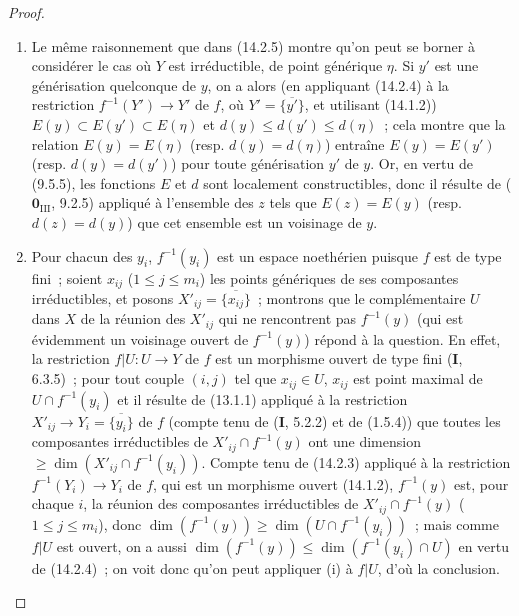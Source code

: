 \begin{proof}
\begin{enumerate}[label=(\roman*)]
  \item Le même raisonnement que dans (14.2.5) montre qu'on peut se borner à
  considérer le cas où $Y$ est irréductible, de point générique $\eta$. Si $y'$
  est une générisation quelconque de $y$, on a alors (en appliquant (14.2.4) à la
  restriction $f^{-1}(Y')\to Y'$ de $f$, où $Y'=\overline{\{y'\}}$, et utilisant
  (14.1.2)) $E(y)\subset E(y')\subset E(\eta)$ et
  $d(y)\leq d(y')\leq d(\eta)$~; cela montre que la relation $E(y)=E(\eta)$
  (resp. $d(y)=d(\eta)$) entraîne $E(y)=E(y')$ (resp. $d(y)=d(y')$) pour toute
  générisation $y'$ de $y$. Or, en vertu de (9.5.5), les fonctions $E$ et $d$ sont
  localement constructibles, donc il résulte de ($\mathbf{0}_{\mathrm{III}}$,
  9.2.5) appliqué à l'ensemble des $z$ tels que $E(z)=E(y)$ (resp.
  $d(z)=d(y)$) que cet ensemble est un voisinage de $y$.

  \item Pour chacun des $y_i$, $f^{-1}(y_i)$ est un espace noethérien puisque $f$
  est de type fini~; soient $x_{ij}$ ($1\leq j\leq m_i$) les points génériques de
  ses composantes irréductibles, et posons $X'_{ij}=\overline{\{x_{ij}\}}$~;
  montrons que le complémentaire $U$ dans $X$ de la réunion des $X'_{ij}$ qui ne
  rencontrent pas $f^{-1}(y)$ (qui est évidemment un voisinage ouvert de
  $f^{-1}(y)$) répond à la question. En effet, la restriction $f|U:U\to Y$ de $f$
  est un morphisme ouvert de type fini (\textbf{I}, 6.3.5)~; pour tout couple $(i,j)$ tel
  que $x_{ij}\in U$, $x_{ij}$ est point maximal de $U\cap f^{-1}(y_i)$ et il
  résulte de (13.1.1) appliqué à la restriction
  $X'_{ij}\to Y_i=\overline{\{y_i\}}$ de $f$ (compte tenu de (\textbf{I}, 5.2.2) et de
  (1.5.4)) que toutes les composantes irréductibles de
  $X'_{ij}\cap f^{-1}(y)$ ont une dimension
  $\geq\dim(X'_{ij}\cap f^{-1}(y_i))$. Compte tenu de (14.2.3) appliqué à la
  restriction $f^{-1}(Y_i)\to Y_i$ de $f$, qui est un morphisme ouvert (14.1.2),
  $f^{-1}(y)$ est, pour chaque $i$, la réunion des composantes irréductibles de
  $X'_{ij}\cap f^{-1}(y)$ ($1\leq j\leq m_i$), donc
  $\dim(f^{-1}(y))\geq\dim(U\cap f^{-1}(y_i))$~; mais comme $f|U$ est ouvert, on a
  aussi $\dim(f^{-1}(y))\leq\dim(f^{-1}(y_i)\cap U)$ en vertu de (14.2.4)~; on voit
  donc qu'on peut appliquer (i) à $f|U$, d'où la conclusion.
\end{enumerate}
\end{proof}

